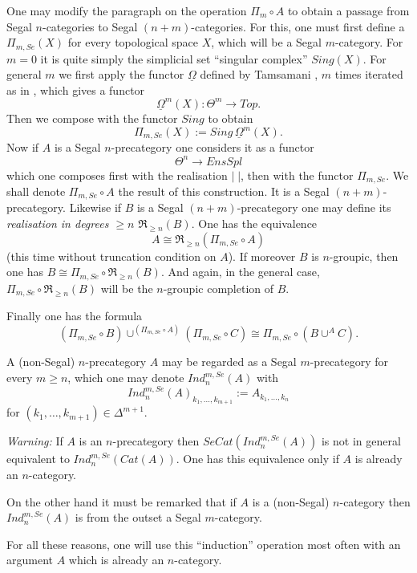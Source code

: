 One may modify the
paragraph on the operation $\Pi _m\circ A$ to obtain a
passage from Segal $n$-categories to Segal $(n+m)$-categories.
For this, one must
first define a $\Pi _{m,Se}(X)$ for every topological space $X$,
which will be a Segal $m$-category.  For $m=0$ it is quite simply the
simplicial set ``singular complex'' $Sing(X)$. For general $m$ we
first apply the functor $\underline{\Omega}$ defined by
Tamsamani
\cite{Tamsamani}, $m$
times iterated as in
\cite{Tamsamani}, which gives a functor
$$
\underline{\Omega}^m(X): \Theta ^m\rightarrow Top.
$$
Then we compose with the functor $Sing$ to obtain
$$
\Pi _{m,Se}(X):= Sing \, \underline{\Omega}^m(X).
$$
Now if $A$
is a Segal $n$-precategory one considers it as
a functor
$$
\Theta ^n\rightarrow EnsSpl
$$
which one composes first with the realisation $| \; |$, then with the functor
$\Pi _{m,Se}$. We shall denote  $\Pi _{m,Se}\circ A$ the result of
this construction. It is a
Segal $(n+m)$-precategory. Likewise if $B$ is a Segal $(n+m)$-precategory
one may
define its {\em realisation in degrees $\geq n$} $\Re _{\geq n}(B)$.
One has the equivalence
$$
A \cong \Re _{\geq n}(\Pi_{m,Se}\circ A)
$$
(this time without truncation condition on $A$).
If moreover $B$ is $n$-groupic, then
one has $B\cong \Pi_{m,Se}\circ \Re _{\geq n}(B)$. And again, in the general
case, $\Pi_{m,Se}\circ \Re _{\geq n}(B)$
will be the $n$-groupic completion of $B$.

Finally one has the formula
$$
(\Pi _{m,Se} \circ B)\cup ^{(\Pi _{m,Se} \circ A)}(\Pi _{m,Se} \circ C)
\cong
\Pi _{m,Se} \circ (B\cup ^AC).
$$


A (non-Segal) $n$-precategory $A$ may be regarded as
a Segal $m$-precategory for every $m\geq n$, which one may denote
$Ind _n^{m,Se}(A)$ with
$$
Ind _n^{m,Se}(A)_{k_1, \ldots , k_{m+1}}:= A_{k_1, \ldots , k_n}
$$
for $(k_1,\ldots , k_{m+1})\in \Delta ^{m+1}$.

{\em Warning:} If $A$ is an $n$-precategory then $SeCat(Ind _n^{m,Se}(A))$
is not in general equivalent to $Ind _n^{m,Se}(Cat(A))$. One has this
equivalence only if $A$ is already an $n$-category.


On the other hand it must be remarked that if  $A$ is a (non-Segal)
$n$-category
then $Ind _n^{m,Se}(A)$ is from the outset a Segal $m$-category.

For all these
reasons, one will use this ``induction'' operation
most often with an argument $A$ which is already an $n$-category.

